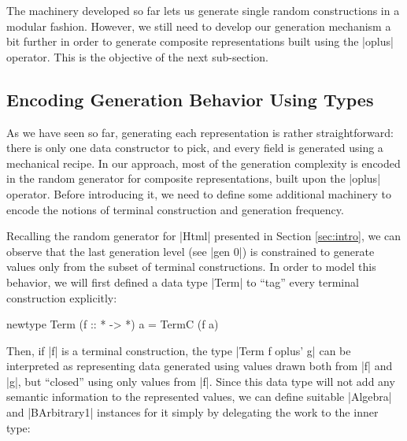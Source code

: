 %
%
The machinery developed so far lets us generate single random constructions in a
modular fashion.
%
However, we still need to develop our generation mechanism a bit further in
order to generate composite representations built using the |oplus| operator.
%
This is the objective of the next sub-section.


%
\subsection{Encoding Generation Behavior Using Types}

As we have seen so far, generating each representation is rather
straightforward: there is only one data constructor to pick, and every field is
generated using a mechanical recipe.
%
In our approach, most of the generation complexity is encoded in the random
generator for composite representations, built upon the |oplus| operator.
%
Before introducing it, we need to define some additional machinery to encode the
notions of terminal construction and generation frequency.
%

Recalling the random generator for |Html| presented in Section \ref{sec:intro},
we can observe that the last generation level (see |gen 0|) is constrained to
generate values only from the subset of terminal constructions.
%
In order to model this behavior, we will first defined a data type |Term| to
``tag'' every terminal construction explicitly:

\begin{code}
newtype Term (f :: * -> *) a = TermC (f a)
\end{code}
%
Then, if |f| is a terminal construction, the type |Term f oplus' g| can be
interpreted as representing data generated using values drawn both from |f| and
|g|, but ``closed'' using only values from |f|.
%
Since this data type will not add any semantic information to the represented
values, we can define suitable |Algebra| and |BArbitrary1| instances for it
simply by delegating the work to the inner type:



